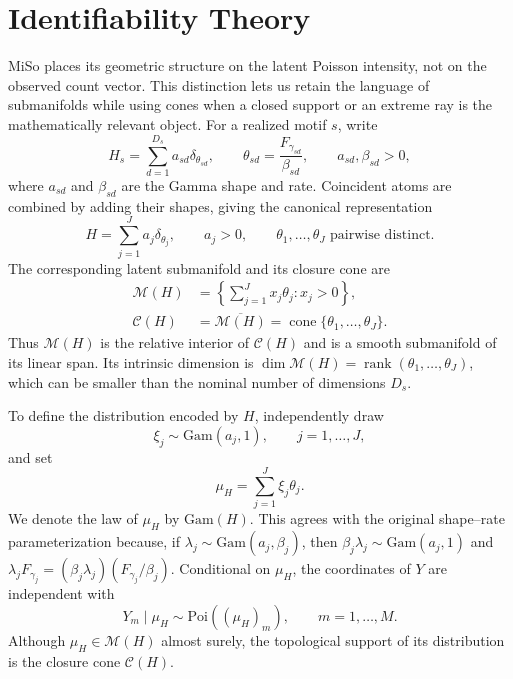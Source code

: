 \documentclass[11pt]{article}
\newcommand{\Poi}{\mathrm{Poi}}
\newcommand{\Gam}{\mathrm{Gam}}
\newcommand{\cone}{\operatorname{cone}}
\theoremstyle{plain}
\theoremstyle{definition}
\begin{document}
\section{Identifiability Theory}
\label{sec:identifiability}

MiSo places its geometric structure on the latent Poisson intensity, not on
the observed count vector.  This distinction lets us retain the language of
submanifolds while using cones when a closed support or an extreme ray is the
mathematically relevant object.  For a realized motif $s$, write
\begin{equation}
  H_s
  =\sum_{d=1}^{D_s}a_{sd}\delta_{\theta_{sd}},
  \qquad
  \theta_{sd}=\frac{F_{\gamma_{sd}}}{\beta_{sd}},
  \qquad a_{sd},\beta_{sd}>0,
  \label{eq:H-miso}
\end{equation}
where $a_{sd}$ and $\beta_{sd}$ are the Gamma shape and rate.  Coincident atoms
are combined by adding their shapes, giving the canonical representation
\begin{equation}
  H=\sum_{j=1}^{J}a_j\delta_{\theta_j},
  \qquad a_j>0,
  \qquad \theta_1,\ldots,\theta_J\text{ pairwise distinct}.
  \label{eq:H-canonical-main}
\end{equation}
The corresponding latent submanifold and its closure cone are
\begin{align}
  \mathcal M(H)
  &=\left\{\sum_{j=1}^{J}x_j\theta_j:x_j>0\right\},
  \label{eq:latent-submanifold}\\
  \mathcal C(H)
  &=\overline{\mathcal M(H)}
    =\cone\{\theta_1,\ldots,\theta_J\}.
  \label{eq:closure-cone}
\end{align}
Thus $\mathcal M(H)$ is the relative interior of $\mathcal C(H)$ and is a
smooth submanifold of its linear span.  Its intrinsic dimension is
$\dim\mathcal M(H)=\operatorname{rank}(\theta_1,\ldots,\theta_J)$, which can
be smaller than the nominal number of dimensions $D_s$.

To define the distribution encoded by $H$, independently draw
\[
  \xi_j\sim\Gam(a_j,1),\qquad j=1,\ldots,J,
\]
and set
\begin{equation}
  \mu_H=\sum_{j=1}^{J}\xi_j\theta_j.
  \label{eq:gamma-H-main}
\end{equation}
We denote the law of $\mu_H$ by $\Gam(H)$.  This agrees with the original
shape--rate parameterization because, if
$\lambda_j\sim\Gam(a_j,\beta_j)$, then
$\beta_j\lambda_j\sim\Gam(a_j,1)$ and
$\lambda_jF_{\gamma_j}=(\beta_j\lambda_j)(F_{\gamma_j}/\beta_j)$.
Conditional on $\mu_H$, the coordinates of $Y$ are independent with
\[
  Y_m\mid\mu_H\sim\Poi((\mu_H)_m),
  \qquad m=1,\ldots,M.
\]
Although $\mu_H\in\mathcal M(H)$ almost surely, the topological support of
its distribution is the closure cone $\mathcal C(H)$.
\end{document}
